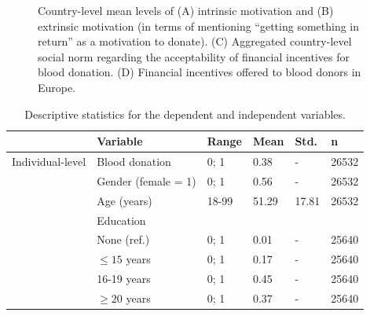 \documentclass[AER]{AEA}
\begin{document}
\begin{figure}[t!]
\begin{subfigure}{.48\textwidth}
\end{subfigure}
\caption{Country-level mean levels of (A) intrinsic motivation and (B) extrinsic motivation (in terms of mentioning “getting something in return” as a motivation to donate). (C) Aggregated country-level social norm regarding the acceptability of financial incentives for blood donation. (D) Financial incentives offered to blood donors in Europe.}
\label{fig:map_descr}
\end{figure}

\begin{table}[]
\caption{Descriptive statistics for the dependent and independent variables.}
\begin{tabular}{l|l|l|l|l|l}
                                   & Variable                                                                                 & Range     & Mean  & Std.  & n     \\ \hline \hline
Individual-level & Blood donation                                                                           & 0; 1      & 0.38  & -     & 26532 \\ %
                                   & Gender (female = 1)                                                                      & 0; 1      & 0.56  & -     & 26532 \\ %
                                   & Age (years)                                                                                      & 18-99     & 51.29 & 17.81 & 26532 \\ %
                                   & Education  &  &  &  &  \\ %
                                   & \hspace{0.5cm} None (ref.)     & 0; 1         & 0.01  & -     & 25640 \\ %
                                   & \hspace{0.5cm} $\leq 15$ years                         & 0; 1         & 0.17  & -     & 25640 \\ %
                                   & \hspace{0.5cm} 16-19 years                       & 0; 1         & 0.45  & -     & 25640 \\ %
                                   & \hspace{0.5cm} $\geq 20$ years                         & 0; 1         & 0.37  & -     & 25640 \\ %

\end{tabular}
\end{table}
\end{document}

